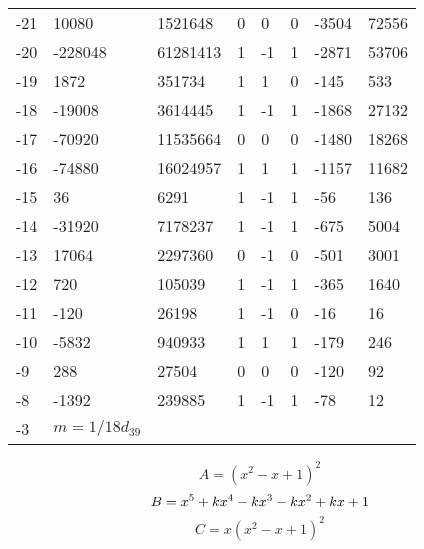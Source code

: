 \documentclass{amsart}
\begin{document}
\begin{longtable}{|l|l|l|lllll|}
-21&10080&1521648&0&0&0&-3504&72556\\
-20&-228048&61281413&1&-1&1&-2871&53706\\
-19&1872&351734&1&1&0&-145&533\\
-18&-19008&3614445&1&-1&1&-1868&27132\\
-17&-70920&11535664&0&0&0&-1480&18268\\
-16&-74880&16024957&1&1&1&-1157&11682\\
-15&36&6291&1&-1&1&-56&136\\
-14&-31920&7178237&1&-1&1&-675&5004\\
-13&17064&2297360&0&-1&0&-501&3001\\
-12&720&105039&1&-1&1&-365&1640\\
-11&-120&26198&1&-1&0&-16&16\\
-10&-5832&940933&1&1&1&-179&246\\
-9&288&27504&0&0&0&-120&92\\
-8&-1392&239885&1&-1&1&-78&12\\
-3&$m=1/18d_{39}$&&\multicolumn{5}{c|}{}\\
\hline
\end{longtable}
$$A=(x^2
 - x
 + 1)^{2}$$
$$B=x^5
 + k\*x^4
 - k\*x^3
 - k\*x^2
 + k\*x
 + 1$$
$$C=x(x^2
 - x
 + 1)^{2}$$
\end{document}
